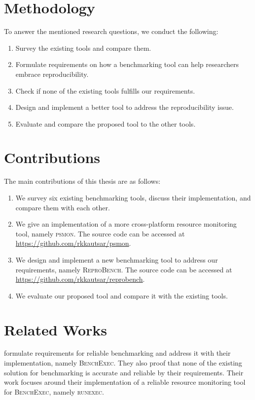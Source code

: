 \section{Methodology}
\label{sec:intro.method}

To answer the mentioned research questions, we conduct the following:
\begin{enumerate}
	\item Survey the existing tools and compare them.
	\item Formulate requirements on how a benchmarking tool can help researchers embrace reproducibility.
	\item Check if none of the existing tools fulfills our requirements.
	\item Design and implement a better tool to address the reproducibility issue.
	\item Evaluate and compare the proposed tool to the other tools.
\end{enumerate}

\section{Contributions}
\label{sec:intro.contributions}

The main contributions of this thesis are as follows:
\begin{enumerate}
	\item We survey six existing benchmarking tools, discuss their implementation, and compare them with each other.
	\item We give an implementation of a more cross-platform resource monitoring tool, namely \textsc{psmon}. The source code can be accessed at \url{https://github.com/rkkautsar/psmon}.
	\item We design and implement a new benchmarking tool to address our requirements, namely \textsc{ReproBench}. The source code can be accessed at \url{https://github.com/rkkautsar/reprobench}.
	\item We evaluate our proposed tool and compare it with the existing tools.
\end{enumerate}


\section{Related Works}
\label{sec:intro.related}

\citet{beyerReliableBenchmarkingRequirements2019} formulate requirements for reliable benchmarking and address it with their implementation, namely \textsc{BenchExec}.
They also proof that none of the existing solution for benchmarking is accurate and reliable by their requirements.
Their work focuses around their implementation of a reliable resource monitoring tool for \textsc{BenchExec}, namely \textsc{runexec}.

